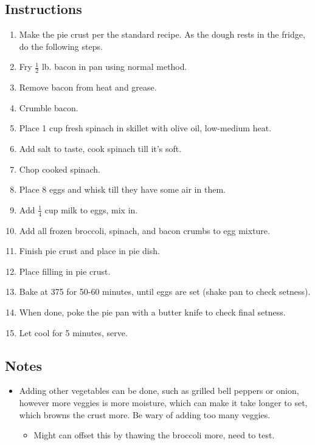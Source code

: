 \begin{multicols}{2}
\subsection*{Instructions}
\begin{enumerate}
    \item Make the pie crust per the standard recipe. As the dough rests in the fridge, do the following steps.
    \item Fry \( \frac{1}{2} \) lb. bacon in pan using normal method.
    \item Remove bacon from heat and grease.
    \item Crumble bacon.
    \item Place 1 cup fresh spinach in skillet with olive oil, low-medium heat.
    \item Add salt to taste, cook spinach till it’s soft.
    \item Chop cooked spinach.
    \item Place 8 eggs and whisk till they have some air in them.
    \item Add \( \frac{1}{4} \) cup milk to eggs, mix in.
    \item Add all frozen broccoli, spinach, and bacon crumbs to egg mixture.
    \item Finish pie crust and place in pie dish.
    \item Place filling in pie crust.
    \item Bake at 375 for 50-60 minutes, until eggs are set (shake pan to check setness).
    \item When done, poke the pie pan with a butter knife to check final setness.
    \item Let cool for 5 minutes, serve.

\end{enumerate}

\subsection*{Notes}
\begin{itemize}
    \item Adding other vegetables can be done, such as grilled bell peppers or onion, however more veggies is more moisture, which can make it take longer to set, which browns the crust more. Be wary of adding too many veggies.
    \begin{itemize}
        \item Might can offset this by thawing the broccoli more, need to test.
    \end{itemize}
\end{itemize}
\end{multicols}
\clearpage